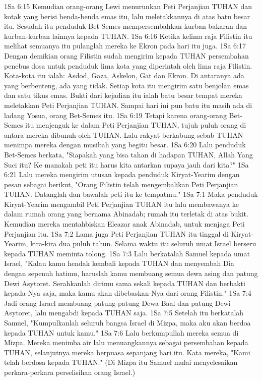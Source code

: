 1Sa 6:15  Kemudian orang-orang Lewi menurunkan Peti Perjanjian TUHAN dan kotak yang berisi benda-benda emas itu, lalu meletakkannya di atas batu besar itu. Sesudah itu penduduk Bet-Semes mempersembahkan kurban bakaran dan kurban-kurban lainnya kepada TUHAN.
1Sa 6:16  Ketika kelima raja Filistin itu melihat semuanya itu pulanglah mereka ke Ekron pada hari itu juga.
1Sa 6:17  Dengan demikian orang Filistin sudah mengirim kepada TUHAN persembahan penebus dosa untuk penduduk lima kota yang diperintah oleh lima raja Filistin. Kota-kota itu ialah: Asdod, Gaza, Askelon, Gat dan Ekron. Di antaranya ada yang berbenteng, ada yang tidak. Setiap kota itu mengirim satu benjolan emas dan satu tikus emas. Bukti dari kejadian itu ialah batu besar tempat mereka meletakkan Peti Perjanjian TUHAN. Sampai hari ini pun batu itu masih ada di ladang Yosua, orang Bet-Semes itu.
1Sa 6:19  Tetapi karena orang-orang Bet-Semes itu menjenguk ke dalam Peti Perjanjian TUHAN, tujuh puluh orang di antara mereka dibunuh oleh TUHAN. Lalu rakyat berkabung sebab TUHAN menimpa mereka dengan musibah yang begitu besar.
1Sa 6:20  Lalu penduduk Bet-Semes berkata, "Siapakah yang bisa tahan di hadapan TUHAN, Allah Yang Suci itu? Ke manakah peti itu harus kita antarkan supaya jauh dari kita?"
1Sa 6:21  Lalu mereka mengirim utusan kepada penduduk Kiryat-Yearim dengan pesan sebagai berikut, "Orang Filistin telah mengembalikan Peti Perjanjian TUHAN. Datanglah dan bawalah peti itu ke tempatmu."
1Sa 7:1  Maka penduduk Kiryat-Yearim mengambil Peti Perjanjian TUHAN itu lalu membawanya ke dalam rumah orang yang bernama Abinadab; rumah itu terletak di atas bukit. Kemudian mereka mentahbiskan Eleazar anak Abinadab, untuk menjaga Peti Perjanjian itu.
1Sa 7:2  Lama juga Peti Perjanjian TUHAN itu tinggal di Kiryat-Yearim, kira-kira dua puluh tahun. Selama waktu itu seluruh umat Israel berseru kepada TUHAN meminta tolong.
1Sa 7:3  Lalu berkatalah Samuel kepada umat Israel, "Kalau kamu hendak kembali kepada TUHAN dan menyembah Dia dengan sepenuh hatimu, haruslah kamu membuang semua dewa asing dan patung Dewi Asytoret. Serahkanlah dirimu sama sekali kepada TUHAN dan berbakti kepada-Nya saja, maka kamu akan dibebaskan-Nya dari orang Filistin."
1Sa 7:4  Jadi orang Israel membuang patung-patung Dewa Baal dan patung Dewi Asytoret, lalu mengabdi kepada TUHAN saja.
1Sa 7:5  Setelah itu berkatalah Samuel, "Kumpulkanlah seluruh bangsa Israel di Mizpa, maka aku akan berdoa kepada TUHAN untuk kamu."
1Sa 7:6  Lalu berkumpullah mereka semua di Mizpa. Mereka menimba air lalu menuangkannya sebagai persembahan kepada TUHAN, selanjutnya mereka berpuasa sepanjang hari itu. Kata mereka, "Kami telah berdosa kepada TUHAN." (Di Mizpa itu Samuel mulai menyelesaikan perkara-perkara perselisihan orang Israel.)
